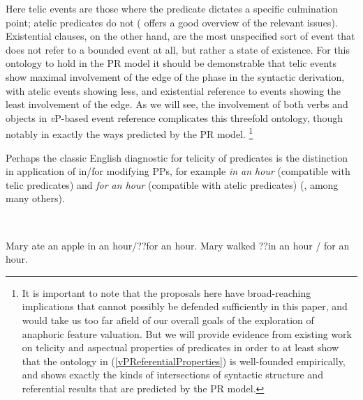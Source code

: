 \documentclass[output=paper
,modfonts
,nonflat
]{langsci/langscibook}
\begin{document}
Here telic events are those where the predicate dictates a specific culmination point; atelic predicates do not (\citealt{Beavers:2012} offers a good overview of the relevant issues). Existential clauses, on the other hand, are the most unspecified sort of event that does not refer to a bounded event at all, but rather a state of existence. For this ontology to hold in the PR model it should be demonstrable that telic events show maximal involvement of the edge of the phase in the syntactic derivation, with atelic events showing less, and existential reference to events showing the least involvement of the edge. As we will see, the involvement of both verbs and objects in \textit{v}P-based event reference complicates this threefold ontology, though notably in exactly the ways predicted by the PR model. \footnote{It is important to note that the proposals here have broad-reaching implications that cannot possibly be defended sufficiently in this paper, and would take us too far afield of our overall goals of the exploration of anaphoric feature valuation. But we will provide evidence from existing work on telicity and aspectual properties of predicates in order to at least show that the ontology in (\ref{vPReferentialProperties}) is well-founded empirically, and shows exactly the kinds of intersections of syntactic structure and referential results that are predicted by the PR model.} %

Perhaps the classic English diagnostic for telicity of predicates is the distinction in application of in/for modifying PPs, for example \textit{in an hour} (compatible with telic predicates) and \textit{for an hour} (compatible with atelic predicates) (\citealt{Vendler:1967,Dowty:1979,Thompson:2006,Beavers:2012}, among many others). 

\ea
{} \\
\begin{xlist}
\ex Mary ate an apple in an hour/??for an hour.   
\ex Mary walked ??in an hour / for an hour.
\end{xlist}

\z
\end{document}
